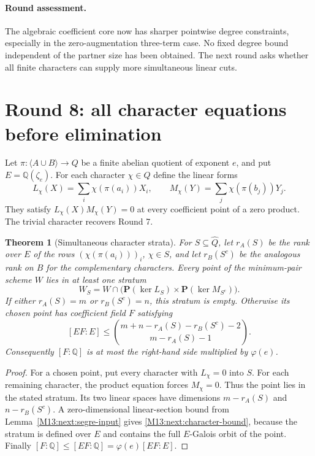 \documentclass[11pt,a4paper,oneside]{report}
\newtheorem{theorem}{Theorem}[section]
\theoremstyle{definition}
\theoremstyle{remark}
\newcommand{\Q}{\mathbb Q}
\begin{document}
\paragraph{Round assessment.}
The algebraic coefficient core now has sharper pointwise degree
constraints, especially in the zero-augmentation three-term case.
No fixed degree bound independent of the partner size has been
obtained. The next round asks whether all finite characters can
supply more simultaneous linear cuts.

\section{Round 8: all character equations before elimination}
\label{M13:next:alg-eight}

Let $\pi:\langle A\cup B\rangle\to Q$ be a finite abelian quotient
of exponent $e$, and put $E=\Q(\zeta_e)$. For each character
$\chi\in\widehat Q$ define the linear forms
\[
 L_\chi(X)=\sum_i\chi(\pi(a_i))X_i,
 \qquad M_\chi(Y)=\sum_j\chi(\pi(b_j))Y_j.
\]
They satisfy $L_\chi(X)M_\chi(Y)=0$ at every coefficient point of
a zero product. The trivial character recovers Round 7.

\begin{theorem}[Simultaneous character strata]
\label{M13:next:character-strata}
For $S\subseteq\widehat Q$, let $r_A(S)$ be the rank over $E$ of
the rows $(\chi(\pi(a_i)))_i$, $\chi\in S$, and let
$r_B(S^c)$ be the analogous rank on $B$ for the complementary
characters. Every point of the minimum-pair scheme $W$ lies in
at least one stratum
\[
 W_S=W\cap
 \bigl(\mathbf P(\ker L_S)\times\mathbf P(\ker M_{S^c})\bigr).
\]
If either $r_A(S)=m$ or $r_B(S^c)=n$, this stratum is empty.
Otherwise its chosen point has coefficient field $F$ satisfying
\begin{equation}\label{M13:next:character-bound}
 [EF:E]\le
 \binom{m+n-r_A(S)-r_B(S^c)-2}{m-r_A(S)-1}.
\end{equation}
Consequently $[F:\Q]$ is at most the right-hand side multiplied
by $\varphi(e)$.
\end{theorem}
\begin{proof}
For a chosen point, put every character with $L_\chi=0$ into $S$.
For each remaining character, the product equation forces
$M_\chi=0$. Thus the point lies in the stated stratum.
Its two linear spaces have dimensions $m-r_A(S)$ and
$n-r_B(S^c)$. A zero-dimensional linear-section bound from
Lemma~\ref{M13:next:segre-input} gives \eqref{M13:next:character-bound},
because the stratum is defined over $E$ and contains the full
$E$-Galois orbit of the point. Finally
$[F:\Q]\le[EF:\Q]=\varphi(e)[EF:E]$.
\end{proof}
\end{document}
